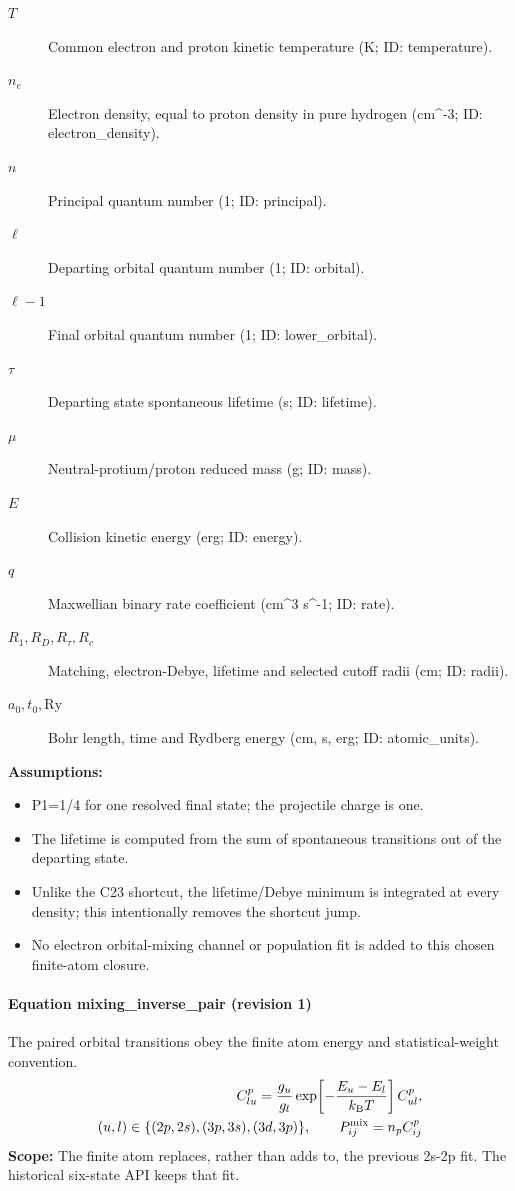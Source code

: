 \begin{description}
\item[$T$] Common electron and proton kinetic temperature (K; ID: temperature).
\item[$n_e$] Electron density, equal to proton density in pure hydrogen (cm\textasciicircum{}-3; ID: electron\_density).
\item[$n$] Principal quantum number (1; ID: principal).
\item[$\ell$] Departing orbital quantum number (1; ID: orbital).
\item[$\ell-1$] Final orbital quantum number (1; ID: lower\_orbital).
\item[$\tau$] Departing state spontaneous lifetime (s; ID: lifetime).
\item[$\mu$] Neutral-protium/proton reduced mass (g; ID: mass).
\item[$E$] Collision kinetic energy (erg; ID: energy).
\item[$q$] Maxwellian binary rate coefficient (cm\textasciicircum{}3 s\textasciicircum{}-1; ID: rate).
\item[$R_1,R_D,R_\tau,R_c$] Matching, electron-Debye, lifetime and selected cutoff radii (cm; ID: radii).
\item[$a_0,t_0,\mathrm{Ry}$] Bohr length, time and Rydberg energy (cm, s, erg; ID: atomic\_units).
\end{description}

\noindent\textbf{Assumptions:}
\begin{itemize}
\item P1=1/4 for one resolved final state; the projectile charge is one.
\item The lifetime is computed from the sum of spontaneous transitions out of the departing state.
\item Unlike the C23 shortcut, the lifetime/Debye minimum is integrated at every density; this intentionally removes the shortcut jump.
\item No electron orbital-mixing channel or population fit is added to this chosen finite-atom closure.
\end{itemize}

\paragraph{Equation mixing\_inverse\_pair (revision 1)}
The paired orbital transitions obey the finite atom energy and statistical-weight convention.
\begin{equation}
\begin{aligned}
C^p_{lu}=\frac{g_u}{g_l}\exp\!\left[-\frac{E_u-E_l}{k_{\rm B}T}\right]C^p_{ul},\\
(u,l)\in\{(2p,2s),(3p,3s),(3d,3p)\},\qquad
P^{\rm mix}_{ij}=n_pC^p_{ij}
\end{aligned}
\label{eq:escape.cloudy_5f_investigation:mixing_5f_inverse_5f_pair:1}
\end{equation}
\noindent\textbf{Scope:} The finite atom replaces, rather than adds to, the previous 2s-2p fit. The historical six-state API keeps that fit.

